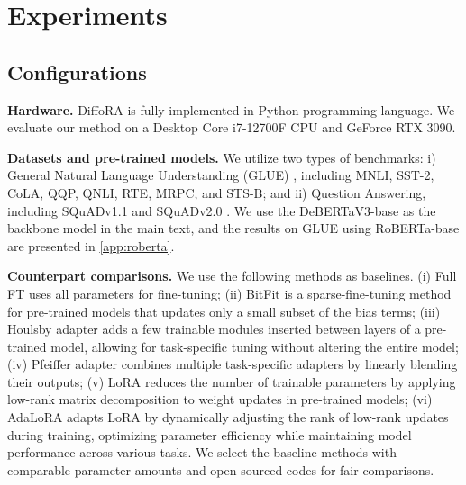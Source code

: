 \section{Experiments}


\subsection{Configurations}

\noindent\textbf{Hardware.} DiffoRA is fully implemented in Python programming language. We evaluate our method on a Desktop Core i7-12700F CPU and GeForce RTX 3090.

\noindent\textbf{Datasets and pre-trained models.} 
We utilize two types of benchmarks: i) General Natural Language Understanding (GLUE) \cite{wang-etal-2018-glue}, including MNLI, SST-2, CoLA, QQP, QNLI, RTE, MRPC, and STS-B; and ii) Question Answering, including SQuADv1.1 \cite{rajpurkar-etal-2016-squad} and SQuADv2.0 \cite{rajpurkar-etal-2018-know}. We use the DeBERTaV3-base \cite{he2023debertav} as the backbone model in the main text, and the results on GLUE using RoBERTa-base \cite{liu2019roberta} are presented in \cref{app:roberta}.

\noindent\textbf{Counterpart comparisons.} We use the following methods as baselines. 
(i) Full FT uses all parameters for fine-tuning;
(ii) BitFit \cite{zaken2022bitfit} is a sparse-fine-tuning method for pre-trained models that updates only a small subset of the bias terms;
(iii) Houlsby adapter \cite{houlsby2019parameter} adds a few trainable modules inserted between layers of a pre-trained model, allowing for task-specific tuning without altering the entire model; 
(iv) Pfeiffer adapter \cite{pfeiffer2021adapterfusion} combines multiple task-specific adapters by linearly blending their outputs;
(v) LoRA \cite{hu2022lora} reduces the number of trainable parameters by applying low-rank matrix decomposition to weight updates in pre-trained models;
(vi) AdaLoRA \cite{zhang2023adaptive} adapts LoRA by dynamically adjusting the rank of low-rank updates during training, optimizing parameter efficiency while maintaining model performance across various tasks. We select the baseline methods with comparable parameter amounts and open-sourced codes for fair comparisons. 

